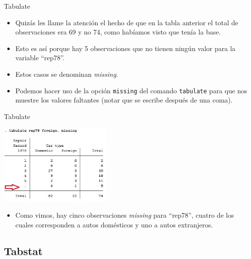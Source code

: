 \documentclass{beamer}
\begin{document}
\begin{frame}{Tabulate}
\begin{itemize}
\item Quizás les llame la atención el hecho de que en la tabla anterior el total de observaciones era 69 y no 74, como habíamos visto que tenía la base. 
\item Esto es así porque hay 5 observaciones que no tienen ningún valor para la variable ``rep78''.
\item Estos casos se denominan \textit{missing}. 
\item Podemos hacer uso de la opción \texttt{missing} del comando \texttt{tabulate} para que nos muestre los valores faltantes (notar que se escribe después de una coma).
\end{itemize}
\end{frame}
\begin{frame}{Tabulate}
\centerline{\includegraphics[height=4cm]{missing.jpg}}
\begin{itemize}
\item Como vimos, hay cinco observaciones \textit{missing} para ``rep78'', cuatro de los cuales corresponden a autos domésticos y uno a autos extranjeros.
\end{itemize}
\end{frame}



\subsection{Tabstat}
\end{document}
